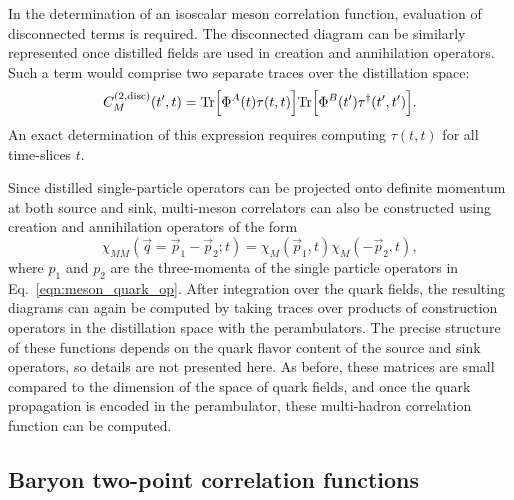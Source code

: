 In the determination of an isoscalar meson correlation function, evaluation of
disconnected terms is required.
The disconnected diagram can be similarly represented once distilled fields are
used in creation and annihilation operators. Such a term would
comprise two separate traces over the distillation space:
\begin{equation}
  C^{(2,\mathrm{disc})}_M(t',t) =
   \mbox{Tr}\Bigl[ \Phi^A(t) \tau(t,t) \Bigr]
   \mbox{Tr}\Bigl[ \Phi^B(t') \tau^\dagger(t' ,t') \Bigr].
\end{equation}
An exact determination of this expression requires computing $\tau(t,t)$ for
all time-slices $t$.

Since distilled single-particle operators can be projected onto definite
momentum at both source and sink, multi-meson correlators can also be
constructed using creation and annihilation operators of the form
\begin{equation}
\chi_{MM}(\vec{q}=\vec{p}_1 - \vec{p}_2; t) = \chi_M(\vec{p}_1,t)
  \chi_M(-\vec{p}_2,t),
\label{eqn:multi_meson_quark_op}
\end{equation}
where $p_1$ and $p_2$ are the three-momenta of the single particle operators
in Eq.~\ref{eqn:meson_quark_op}. After integration over the quark fields, the
resulting diagrams can again be computed by taking traces over products of
construction operators in the distillation space with the perambulators.
The precise structure of these functions depends on the quark flavor content of
the source and sink operators, so details are not presented here.  As before,
these matrices are small compared to the dimension of the space of quark
fields, and once the quark propagation is encoded in the perambulator,
these multi-hadron correlation function can be computed.

\subsection{Baryon two-point correlation functions}\label{subsec:theory-baryons}

